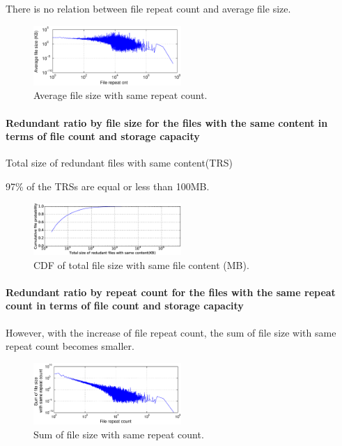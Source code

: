 There is no relation between file repeat count and average file size.

\begin{figure}
	\centering
	\includegraphics[width=0.5\textwidth]{graphs/avg_size_by_cnt.eps}
	\caption{Average file size with same repeat count.
	}
	\label{fig_avg_size_by_cnt}
\end{figure}

\paragraph{Redundant ratio by file size for the files with the same content in terms of file count and storage capacity}
Total size of redundant files with same content(TRS)

97\% of the TRSs are equal or less than 100MB.

\begin{figure}
	\centering
	\includegraphics[width=0.5\textwidth]{graphs/Total_size_of_redudant_files_with_same_content-KB.eps}
	\caption{CDF of total file size with same file content (MB).
	}
	\label{fig_total_redundant_same_digest}
\end{figure}

\paragraph{Redundant ratio by repeat count for the files with the same repeat count in terms of file count and storage capacity}

However, with the increase of file repeat count, the sum of file size with same repeat count becomes smaller.

\begin{figure}
	\centering
	\includegraphics[width=0.5\textwidth]{graphs/sum_size_by_cnt.eps}
	\caption{Sum of file size with same repeat count.
	}
	\label{fig_sum_by_cnt}
\end{figure}


